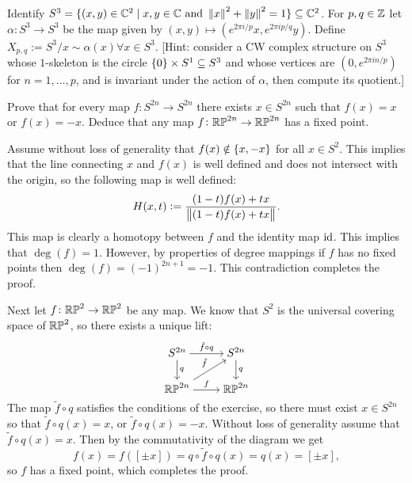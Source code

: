 \documentclass[11pt,a4paper]{article}
\begin{document}
\begin{exercise}
  Identify $S^3 = \{(x,y) \in \mathbb{C}^2 \mid
    x,y \in \mathbb{C} \text{ and } \left\lVert x\right\rVert^2 + \left\lVert y\right\rVert^2 = 1\} \subseteq \mathbb{C}^2$.
  For $p,q \in \mathbb{Z}$ let $\alpha \colon S^3 \to S^3$ be the map given by
  $(x,y) \mapsto (e^{2\pi i/p}x, e^{2\pi i p/q}y)$.
  Define $X_{p,q} := S^3/x \sim \alpha(x) \forall x \in S^3$.
  [Hint:
  consider a CW complex structure on $S^3$ whose $1$-skeleton is the circle
  $\left\{0\right\} \times S^1 \subseteq S^3$ and whose vertices are
  $(0,e^{2\pi i n/p})$ for $n=1,\dots,p$,
  and is invariant under the action of $\alpha$,
  then compute its quotient.]
\end{exercise}
\begin{solution}

\end{solution}

\begin{exercise}
  Prove that for every map $f \colon S^{2n} \to S^{2n}$ there exists
  $x \in S^{2n}$ such that $f(x) = x$ or $f(x) = -x$.
  Deduce that any map $f \colon \mathbb{RP}^{2n} \to \mathbb{RP}^{2n}$ has a fixed point.
\end{exercise}
\begin{solution}
  Assume without loss of generality that $f(x) \notin \left\{x,-x\right\}$
  for all $x \in S^2$.
  This implies that the line connecting $x$ and $f(x)$ is well defined
  and does not intersect with the origin, so the following map is well
  defined:
  \[
    H(x,t) := \frac{(1 - t) f(x) + t x}{\left\lVert(1 - t) f(x) + t x\right\rVert}.
  \]
  This map is clearly a homotopy between $f$ and the identity map $\operatorname{id}$.
  This implies that $\deg(f) = 1$.
  However, by properties of degree mappings if $f$ has no fixed points
  then $\deg(f) = (-1)^{2n + 1} = -1$.
  This contradiction completes the proof.

  Next let $f \colon \mathbb{RP}^2 \to \mathbb{RP}^2$ be any map.
  We know that $S^2$ is the universal covering space of $\mathbb{RP}^2$,
  so there exists a unique lift:
  \[\begin{tikzcd}[ampersand replacement=\&,cramped]
    {S^{2n}} \& {S^{2n}} \\
    {\RP^{2n}} \& {\RP^{2n}}
    \arrow["{\tilde f \circ q}", from=1-1, to=1-2]
    \arrow["q", from=1-1, to=2-1]
    \arrow["q", from=1-2, to=2-2]
    \arrow["{\tilde f}", from=2-1, to=1-2]
    \arrow["f", from=2-1, to=2-2]
  \end{tikzcd}\]
  The map $\tilde f \circ q$ satisfies the conditions of the exercise,
  so there must exist $x \in S^{2n}$ so that $\tilde f \circ q(x) = x$,
  or $\tilde f \circ q(x) = -x$.
  Without loss of generality assume that $\tilde f \circ q(x) = x$.
  Then by the commutativity of the diagram
  we get
  \[
    f(x) =
    f([\pm x]) =
    q \circ \tilde f \circ q(x) =
    q(x) =
    [\pm x],
  \]
  so $f$ has a fixed point, which completes the proof.
\end{solution}
\end{document}
